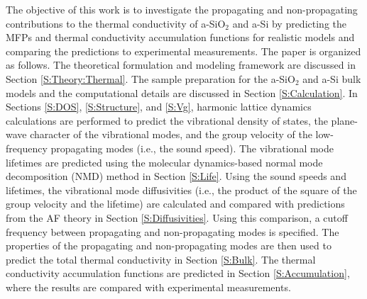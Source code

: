 \documentclass[aps,prb,onecolumn,preprint,superscriptaddress,footinbib,amsmath,amssymb,floatfix]{revtex4}
\begin{document}
The objective of this work is to investigate the propagating 
and non-propagating contributions to the thermal conductivity 
of a-SiO$_2$ and a-Si   
by predicting the MFPs and thermal conductivity 
accumulation functions for realistic models and comparing the 
predictions to experimental measurements. 
The paper is organized as follows. 
The theoretical formulation and modeling framework are 
discussed in Section \ref{S:Theory:Thermal}. The sample preparation 
for the a-SiO$_2$ and a-Si bulk models and the computational details 
are discussed in Section \ref{S:Calculation}. 
In Sections \ref{S:DOS}, \ref{S:Structure}, and \ref{S:Vg}, 
harmonic lattice dynamics calculations 
are performed to predict the vibrational density of 
states, the plane-wave character of the vibrational modes, and  
the group velocity of the low-frequency propagating modes (i.e., 
the sound speed). 
The vibrational mode lifetimes are predicted using the
molecular dynamics-based normal 
mode decomposition (NMD) method in Section \ref{S:Life}. 
Using the sound speeds and lifetimes, the vibrational 
mode diffusivities (i.e., the product of the square of 
the group velocity and the lifetime) are calculated and compared 
with predictions from the AF theory in Section \ref{S:Diffusivities}. 
Using this comparison, a cutoff frequency between propagating and 
non-propagating modes is specified. 
The properties of the propagating and non-propagating 
modes are then used to predict the total thermal 
conductivity in Section \ref{S:Bulk}. 
The thermal conductivity accumulation functions 
are predicted in Section \ref{S:Accumulation}, 
where the results are compared with experimental measurements. 

\end{document}
